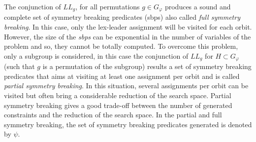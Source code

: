 The conjunction of $LL_g$, for all permutations  $g \in G_{\varphi} $ produces a sound and complete set of symmetry breaking predicates (sbps) also called \emph{full symmetry breaking}.
In this case, only the lex-leader assignment will be visited for each orbit.
However, the size of the \textit{sbps} can be exponential in the number of variables of the problem and so, they cannot be totally computed.
To overcome this problem, only a subgroup is considered, in this case the
conjunction of $LL_g$ for $H \subset G_{\varphi}$ (such that $g$ is a permutation of the subgroup) results a set of symmetry breaking predicates 
that aims at visiting at least one assignment per orbit and is called \emph{partial symmetry breaking}.
In this situation, several assignments per orbit can be visited but often bring a considerable reduction of the
search space. Partial symmetry breaking gives a good trade-off between the number of generated constraints and the reduction of the search space.
In the partial and full symmetry breaking, the set of symmetry breaking predicates generated is denoted by $\psi$.
%
%

